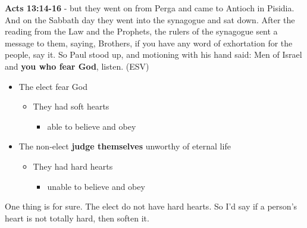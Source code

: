 \documentclass[11pt]{article}
\begin{document}
\textbf{Acts 13:14-16} - but they went on from Perga and came to Antioch in Pisidia.  And on the Sabbath day they went into the synagogue and sat down.  After the reading from the Law and the Prophets, the rulers of the synagogue sent a message to them, saying, Brothers, if you have any word of exhortation for the people, say it.  So Paul stood up, and motioning with his hand said: Men of Israel and \textbf{you who fear God}, listen.  (ESV)

\begin{itemize}
\item The elect fear God
\begin{itemize}
\item They had soft hearts
\begin{itemize}
\item able to believe and obey
\end{itemize}
\end{itemize}
\item The non-elect \textbf{judge themselves} unworthy of eternal life
\begin{itemize}
\item They had hard hearts
\begin{itemize}
\item unable to believe and obey
\end{itemize}
\end{itemize}
\end{itemize}

One thing is for sure. The elect do not have hard hearts.
So I'd say if a person's heart is not totally hard, then soften it.
\end{document}
